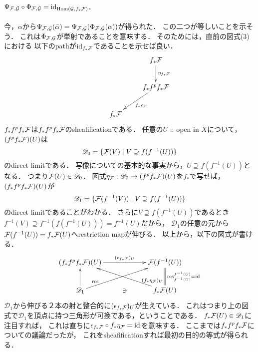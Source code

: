 \documentclass[a4paper]{jsarticle}
\begin{document}
    \paragraph{$\Psi_{\mathcal{F}, \mathcal{G}} \circ \Phi_{\mathcal{F}, \mathcal{G}}=\mathrm{id}_{\operatorname{Hom}(\mathcal{G}, f_*\mathcal{F})}$.}
    今，$\alpha$から$\Psi_{\mathcal{F}, \mathcal{G}}(\bar{\alpha})=\Psi_{\mathcal{F}, \mathcal{G}}(\Phi_{\mathcal{F}, \mathcal{G}}(\alpha))$が得られた．
    この二つが等しいことを示そう．
    これは$\Phi_{\mathcal{F}, \mathcal{G}}$が単射であることを意味する．
    そのためには，直前の図式(3)における
    以下のpathが$\mathrm{id}_{f_* \mathcal{F}}$であることを示せば良い．
    \[
        \xymatrix
        {
        {} & {} & f_* \shF \ar[d]^-{\eta_{f_* \shF}} \\
        {} & {} & f_* f^p f_* \shF \ar[ld]^-{f_* \epsilon_{\shF}} \\
        {} & f_* \shF  & {} \\
        }
    \]
    $f_* f^p f_* \mathcal{F}$は$f_* f^p f_* \mathcal{F}$のsheafificationである．
    任意の$U$ :: open in $X$について，
    $(f^p f_* \mathcal{F})(U)$は
    \[ \mathscr{D}_0=\{ \mathcal{F}(V) \mid V \supseteq f(f^{-1}(U)) \} \]のdirect limitである．
    写像についての基本的な事実から，$U \supseteq f(f^{-1}(U))$となる．
    つまり$\mathcal{F}(U) \in \mathscr{D}_0$．
    図式$\eta_{\mathcal{F}}: \mathscr{D}_0 \to (f^p f_* \mathcal{F})(U)$を$f_*$で写せば，
    $(f_* f^p f_* \mathcal{F})(U)$が
    \[ \mathscr{D}_1=\{\mathcal{F}(f^{-1}(V)) \mid V \supseteq f(f^{-1}(U)) \} \]
    のdirect limitであることがわかる．
    さらに$V \supseteq f(f^{-1}(U))$であるとき
    $f^{-1}(V) \supseteq f^{-1}(f(f^{-1}(U)))=f^{-1}(U)$だから，
    $\mathscr{D}_1$の任意の元から$\mathcal{F}(f^{-1}(U))=f_*\mathcal{F}(U)$へrestriction mapが伸びる．
    以上から，以下の図式が書ける．
    \[
    \xymatrix
    {
    (f_* f^p f_* \shF)(U) \ar[rr]^-{(\epsilon_{f_*\shF})_U}& {} & \shF(f^{-1}(U)) \\
    \mathscr{D}_1 \ar[u] \ar[urr]^(.2){\res}
    & \ni 
    & f_*\shF(U) \ar@{=}[u]_-{\res_{f^{-1}(U)}^{f^{-1}(U)}=\id{}} \ar[ull]_(.2){(f_*\eta_{\shF})_U}
    }
    \]
    $\mathscr{D}_1$から伸びる２本の射と整合的に$(\epsilon_{f_*\mathcal{F}})_U$が生えている．
    これはつまり上の図式で$\mathscr{D}_1$を頂点に持つ三角形が可換である，ということである．
    $f_*\mathcal{F}(U) \in \mathscr{D}_1$に注目すれば，
    これは直ちに$\epsilon_{f_*\mathcal{F}} \circ f_*\eta_{\mathcal{F}}=\mathrm{id}_{}$を意味する．
    ここまでは$f_* f^p f_*\mathcal{F}$についての議論だったが，
    これをsheafificationすれば最初の目的の等式が得られる．
\end{document}
